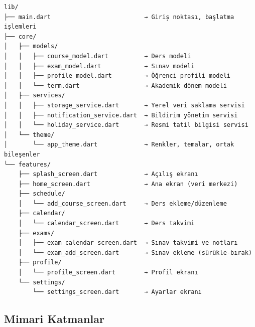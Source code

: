 \documentclass[12pt,a4paper]{article}
\begin{document}
\begin{tcolorbox}[yapiKutusu]
\begin{verbatim}
lib/
├── main.dart                          → Giriş noktası, başlatma işlemleri
├── core/
│   ├── models/
│   │   ├── course_model.dart          → Ders modeli
│   │   ├── exam_model.dart            → Sınav modeli
│   │   ├── profile_model.dart         → Öğrenci profili modeli
│   │   └── term.dart                  → Akademik dönem modeli
│   ├── services/
│   │   ├── storage_service.dart       → Yerel veri saklama servisi
│   │   ├── notification_service.dart  → Bildirim yönetim servisi
│   │   └── holiday_service.dart       → Resmi tatil bilgisi servisi
│   └── theme/
│       └── app_theme.dart             → Renkler, temalar, ortak bileşenler
└── features/
    ├── splash_screen.dart             → Açılış ekranı
    ├── home_screen.dart               → Ana ekran (veri merkezi)
    ├── schedule/
    │   └── add_course_screen.dart     → Ders ekleme/düzenleme
    ├── calendar/
    │   └── calendar_screen.dart       → Ders takvimi
    ├── exams/
    │   ├── exam_calendar_screen.dart  → Sınav takvimi ve notları
    │   └── exam_add_screen.dart       → Sınav ekleme (sürükle-bırak)
    ├── profile/
    │   └── profile_screen.dart        → Profil ekranı
    └── settings/
        └── settings_screen.dart       → Ayarlar ekranı
\end{verbatim}
\end{tcolorbox}

\subsection{Mimari Katmanlar}
\end{document}

